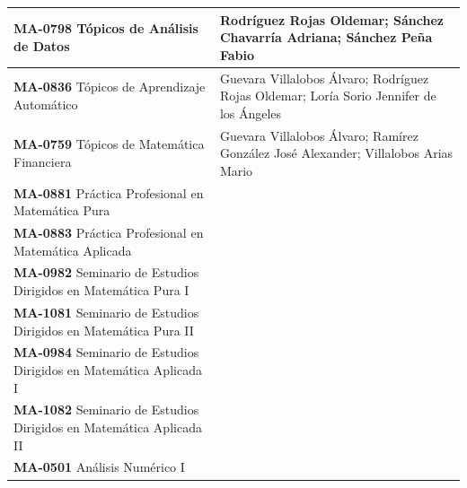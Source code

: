 \begin{longtable}{|>{\raggedright\arraybackslash}p{6.9cm}|>{\raggedright\arraybackslash}p{9.8cm}|}
\textbf{MA-0798} Tópicos de Análisis de Datos & Rodríguez Rojas Oldemar; Sánchez Chavarría Adriana; Sánchez Peña Fabio \\ \hline
\textbf{MA-0836} Tópicos de Aprendizaje Automático & Guevara Villalobos Álvaro; Rodríguez Rojas Oldemar; Loría Sorio Jennifer de los Ángeles \\ \hline
\textbf{MA-0759} Tópicos de Matemática Financiera & Guevara Villalobos Álvaro; Ramírez González José Alexander; Villalobos Arias Mario \\ \hline
\textbf{MA-0881} Práctica Profesional en Matemática Pura &  \\ \hline
\textbf{MA-0883} Práctica Profesional en Matemática Aplicada &  \\ \hline
\textbf{MA-0982} Seminario de Estudios Dirigidos en Matemática Pura I &  \\ \hline
\textbf{MA-1081} Seminario de Estudios Dirigidos en Matemática Pura II &  \\ \hline
\textbf{MA-0984} Seminario de Estudios Dirigidos en Matemática Aplicada I &  \\ \hline
\textbf{MA-1082} Seminario de Estudios Dirigidos en Matemática Aplicada II &  \\ \hline
\textbf{MA-0501} Análisis Numérico I & \textit{} \\ \hline

\end{longtable}
\endgroup
